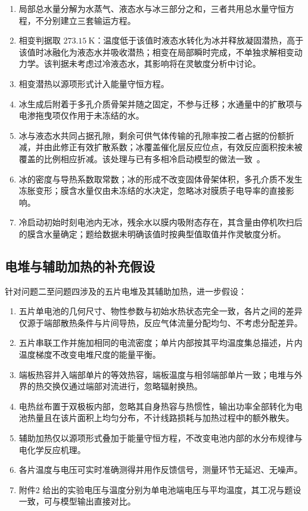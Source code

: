 \documentclass{gmcmthesis}
\begin{document}
\begin{enumerate}
  \item 局部总水量分解为水蒸气、液态水与冰三部分之和，三者共用总水量守恒方程，不分别建立三套输运方程。
  \item 相变判据取 $273.15~\mathrm{K}$：温度低于该值时液态水转化为冰并释放凝固潜热，高于该值时冰融化为液态水并吸收潜热；相变在局部瞬时完成，不单独求解相变动力学。该判据未考虑过冷液态水，其影响将在灵敏度分析中讨论。
  \item 相变潜热以源项形式计入能量守恒方程。
  \item 冰生成后附着于多孔介质骨架并随之固定，不参与迁移；水通量中的扩散项与电渗拖曳项仅作用于未冻结的水。
  \item 冰与液态水共同占据孔隙，剩余可供气体传输的孔隙率按二者占据的份额折减，并由此修正有效扩散系数；冰覆盖催化层反应位点，有效反应面积按未被覆盖的比例相应折减。该处理与已有多相冷启动模型的做法一致~\cite{mao2007multiphase}。
  \item 冰的密度与导热系数取常数；冰的形成不改变固体骨架体积，多孔介质不发生冻胀变形；膜含水量仅由未冻结的水决定，忽略冰对膜质子电导率的直接影响。
  \item 冷启动初始时刻电池内无冰，残余水以膜内吸附态存在，其含量由停机吹扫后的膜含水量确定；题给数据未明确该值时按典型值取值并作灵敏度分析。
\end{enumerate}

\subsection{电堆与辅助加热的补充假设}
针对问题二至问题四涉及的五片电堆及其辅助加热，进一步假设：

\begin{enumerate}
  \item 五片单电池的几何尺寸、物性参数与初始水热状态完全一致，各片之间的差异仅源于端部散热条件与片间导热，反应气体流量分配均匀、不考虑分配差异。
  \item 五片串联工作并施加相同的电流密度；单片内部按其平均温度集总描述，片内温度梯度不改变电堆尺度的能量平衡。
  \item 端板热容并入端部单片的等效热容，端板温度与相邻端部单片一致；电堆与外界的热交换仅通过端部对流进行，忽略辐射换热。
  \item 电热丝布置于双极板内部，忽略其自身热容与热惯性，输出功率全部转化为电池热量且在该片面积上均匀分布，不计线路损耗与加热过程中的额外散失。
  \item 辅助加热仅以源项形式叠加于能量守恒方程，不改变电池内部的水分布规律与电化学反应机理。
  \item 各片温度与电压可实时准确测得并用作反馈信号，测量环节无延迟、无噪声。
  \item 附件2 给出的实验电压与温度分别为单电池端电压与平均温度，其工况与题设一致，可与模型输出直接对比。
\end{enumerate}
\end{document}
